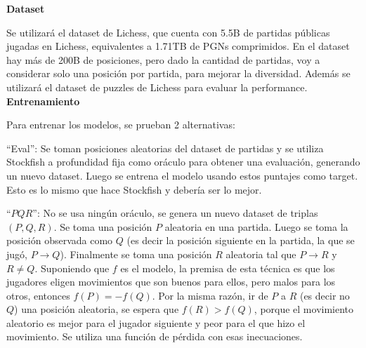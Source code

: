\textbf{Dataset}

Se utilizará el dataset de Lichess, que cuenta con 5.5B de partidas públicas jugadas en Lichess, equivalentes a 1.71TB de PGNs comprimidos. En el dataset hay más de 200B de posiciones, pero dado la cantidad de partidas, voy a considerar solo una posición por partida, para mejorar la diversidad. Además se utilizará el dataset de puzzles de Lichess para evaluar la performance. \\

\textbf{Entrenamiento}

Para entrenar los modelos, se prueban 2 alternativas:

``Eval'': Se toman posiciones aleatorias del dataset de partidas y se utiliza Stockfish a profundidad fija como oráculo para obtener una evaluación, generando un nuevo dataset. Luego se entrena el modelo usando estos puntajes como target. Esto es lo mismo que hace Stockfish y debería ser lo mejor.


\cite{dlchess:2014}

``$PQR$'': No se usa ningún oráculo, se genera un nuevo dataset de triplas $(P,Q,R)$. Se toma una posición $P$ aleatoria en una partida. Luego se toma la posición observada como $Q$ (es decir la posición siguiente en la partida, la que se jugó, $P \rightarrow Q$). Finalmente se toma una posición $R$ aleatoria tal que $P \rightarrow R$ y $R \neq Q$. Suponiendo que $f$ es el modelo, la premisa de esta técnica es que los jugadores eligen movimientos que son buenos para ellos, pero malos para los otros, entonces $f(P)=-f(Q)$. Por la misma razón, ir de $P$ a $R$ (es decir no $Q$) una posición aleatoria, se espera que $f(R) > f(Q)$, porque el movimiento aleatorio es mejor para el jugador siguiente y peor para el que hizo el movimiento. Se utiliza una función de pérdida con esas inecuaciones.
